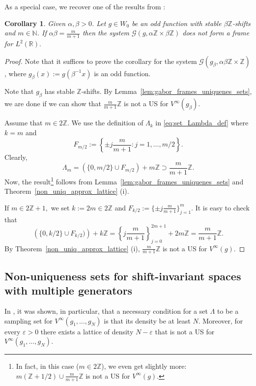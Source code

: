 \documentclass[12pt]{amsart}
\numberwithin{equation}{section}
\newtheorem{corollary}[theorem]{Corollary} \newcommand{\La}{\Lambda}
\newcommand{\R}{{\mathbb R}} \newcommand{\Q}{{\mathbb Q}} \newcommand{\Z}{{\mathbb Z}} \newcommand{\N}{{\mathbb N}}
\begin{document}
As a special case, we recover one of the results from \cite{MR3027914}:
 \begin{corollary}\label{cor:lyub_nes}
 Given $\alpha, \beta > 0$. Let $g \in W_0$ be an odd function with stable $\beta\Z$-shifts and $m\in\N$.
 If $\alpha\beta=\frac{m}{m+1}$ then the system $\mathcal{G}(g, \alpha \Z \times \beta \Z)$  does not form a frame for $L^2(\R).$
 \end{corollary}
 \begin{proof}
     Note that it suffices to prove the corollary for the system $\mathcal{G}(g_{\beta}, \alpha \beta \Z \times \Z)$, where $g_{\beta}(x):=g(\beta^{-1}x)$ is an odd function. 

     Note that $g_{\beta}$ has stable $\Z$-shifts.
     By Lemma~\ref{lem:gabor_frames_uniquenes_sets}, we are done if we can show that $ \frac{m}{m+1}\Z$ is not a US for $V^{\infty}(g_{\beta})$.
     
     Assume that $m\in 2\Z$. We use the definition of $\Lambda_k$ in \eqref{eq:set_Lambda_def} where $k=m$ and $$F_{m/2}:=\left\{\pm j\frac{m}{m+1}: j=1,\dots,m/2\right\}.$$ Clearly, $$\Lambda_m=(\{0,m/2\}\cup F_{m/2})+m\Z \supset \frac{m}{m+1}\Z.$$ Now, the result\footnote{In fact, in this case ($m\in 2\Z$), we even get slightly more: $m(\Z+1/2) \cup \frac{m}{m+1}\Z$ is not a US for $V^\infty(g).$} follows from Lemma~\ref{lem:gabor_frames_uniquenes_sets} and  Theorem~\ref{non_uniq_approx_lattice} (i).

If $m\in 2\Z+1,$ we set $k:=2m\in 2\Z$ and  $F_{k/2}:=\{\pm j\frac{m}{m+1}\}_{j=1}^m.$ It is easy to check that $$\left(\{0, k/2\} \cup F_{k/2} )\right) +k\Z = \left\{j\frac{m}{m+1}\right\}_{j=0}^{2m+1}+2m\Z=\frac{m}{m+1}\Z.$$By Theorem~\ref{non_uniq_approx_lattice} (i),  $\frac{m}{m+1}\Z$ is not a US for $V^\infty(g).$
\end{proof}

 

\subsection{ Non-uniqueness sets for shift-invariant spaces with multiple generators}

In \cite[Theorem 5]{MR1756138}, it was shown, in particular, that a necessary condition for a set $\Lambda$ to be a sampling set for $V^{\infty}(g_1,\dots,g_N)$ is that its density be at least $N$. 
Moreover, for every $\varepsilon>0$ there exists a lattice of density $N-\varepsilon$ that is not a US for $V^\infty(g_1,\dots,g_N)$. 
\end{document}
